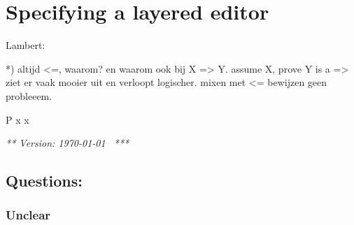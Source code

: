 \chapter{Specifying a layered editor}
\label{chap:singleLayer}


\bc
Lambert:

*) altijd <=, waarom? en waarom ook bij X => Y. assume X, prove Y is a =>
ziet er vaak mooier uit en verloopt logischer. mixen met <= bewijzen geen probleeem.

P x   \eq   x 



\ec
\renewcommand{\present}{\ensuremath{\mathit{present}}}
\renewcommand{\interpret}{\ensuremath{\mathit{interpret}}}
\newcommand{\spc}{\textvisiblespace}


\renewcommand{\H}{_{\, \mathrm H}}  %
\renewcommand{\L}{_{\, \mathrm L}} %
\newcommand{\M}{_{\, \mathrm M}}
\newcommand{\HH}{_{\, \mathrm {HH}}} 
\newcommand{\HL}{_{\, \mathrm {HL}}} 
\newcommand{\LH}{_{\, \mathrm {LH}}} 
\newcommand{\LL}{_{\, \mathrm {LL}}} 
\newcommand{\CH}{_{\, \mathrm {CH}}} 
\newcommand{\CL}{_{\, \mathrm {CL}}} 
\newcommand{\C}{_{\, \mathrm C}} 
\newcommand{\Eqclass}[2]{{#1}\!/_{{#2}}}
\newcommand{\eqclass}[2]{[\,{#1}\,]_{{#2}}}
\newcommand{\Eqcl}[2]{\Eqclass{#1}{_{\!\!{#2}}}}
\newcommand{\eqcl}[2]{\eqclass{#1}{\!_{#2}}}
\newcommand{\Eqstarcl}[2]{{#1}/_{\!\stackrel{*}{\simeq} {\mathrm {#2}}}}
\newcommand{\eqstarcl}[2]{[\,{#1}\,]_{\!\stackrel{*}{\simeq} {\mathrm {#2}}}}
\newcommand{\eqr}{\ensuremath{\simeq}}
\newcommand{\eqstar}{\ensuremath{\stackrel{*}{\simeq}}}
\newcommand{\reuz}{\ensuremath{\triangleright}}
\newcommand{\reuze}[1]{\ensuremath{\triangleright_{_{\!\!#1}}}}
\newcommand{\reuzestar}{\ensuremath{\stackrel{*}{\triangleright}}}
\newcommand{\rel}{\ensuremath{\sim}}

\newcommand{\powerset}{\mathcal{P}}
{\em *** Version: \today~ ***}


\section{Questions:}

\subsection{Unclear}



